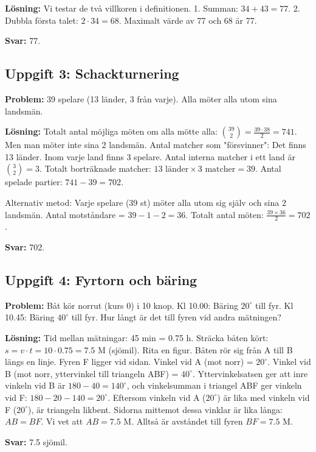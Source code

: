 \documentclass[11pt, a4paper]{article}
\begin{document}
\textbf{Lösning:}
Vi testar de två villkoren i definitionen.
1. Summan: $34 + 43 = 77$.
2. Dubbla första talet: $2 \cdot 34 = 68$.
Maximalt värde av 77 och 68 är 77.

\textbf{Svar:} 77.

\subsection{Uppgift 3: Schackturnering}
\textbf{Problem:} 39 spelare (13 länder, 3 från varje). Alla möter alla utom sina landsmän.

\textbf{Lösning:}
Totalt antal möjliga möten om alla mötte alla: $\binom{39}{2} = \frac{39 \cdot 38}{2} = 741$.
Men man möter inte sina 2 landsmän.
Antal matcher som "försvinner": Det finns 13 länder. Inom varje land finns 3 spelare. Antal interna matcher i ett land är $\binom{3}{2} = 3$.
Totalt borträknade matcher: $13 \text{ länder} \times 3 \text{ matcher} = 39$.
Antal spelade partier: $741 - 39 = 702$.

Alternativ metod:
Varje spelare (39 st) möter alla utom sig själv och sina 2 landsmän. Antal motståndare = $39 - 1 - 2 = 36$.
Totalt antal möten: $\frac{39 \times 36}{2} = 702$.

\textbf{Svar:} 702.

\subsection{Uppgift 4: Fyrtorn och bäring}
\textbf{Problem:} Båt kör norrut (kurs 0) i 10 knop.
Kl 10.00: Bäring $20^\circ$ till fyr.
Kl 10.45: Bäring $40^\circ$ till fyr.
Hur långt är det till fyren vid andra mätningen?

\textbf{Lösning:}
Tid mellan mätningar: 45 min = 0.75 h.
Sträcka båten kört: $s = v \cdot t = 10 \cdot 0.75 = 7.5$ M (sjömil).
Rita en figur. Båten rör sig från A till B längs en linje. Fyren F ligger vid sidan.
Vinkel vid A (mot norr) = $20^\circ$.
Vinkel vid B (mot norr, yttervinkel till triangeln ABF) = $40^\circ$.
Yttervinkelsatsen ger att inre vinkeln vid B är $180-40=140^\circ$, och vinkelsumman i triangel ABF ger vinkeln vid F: $180 - 20 - 140 = 20^\circ$.
Eftersom vinkeln vid A ($20^\circ$) är lika med vinkeln vid F ($20^\circ$), är triangeln likbent.
Sidorna mittemot dessa vinklar är lika långa: $AB = BF$.
Vi vet att $AB = 7.5$ M.
Alltså är avståndet till fyren $BF = 7.5$ M.

\textbf{Svar:} 7.5 sjömil.

\newpage
\end{document}
